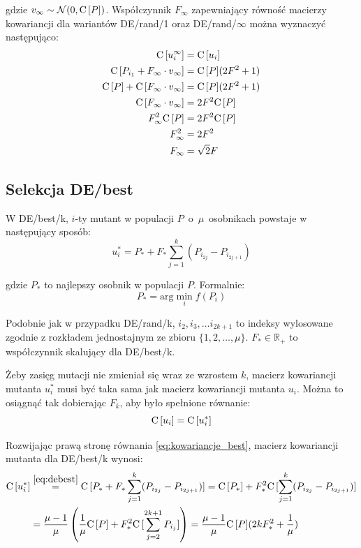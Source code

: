 \documentclass[a4paper,onecolumn,oneside,12pt,wide,floatssmall]{mwrep}
\def\C{{\rm C}\,}
\theoremstyle{definition}
\theoremstyle{plain}%
\theoremstyle{remark}
\begin{document}
gdzie $v_\infty \sim \mathcal{N}(0, \C[P])$. Współczynnik $F_\infty$ zapewniający
równość macierzy kowariancji dla wariantów DE/rand/1 oraz DE/rand/$\infty$
można wyznaczyć następująco:
\begin{align*}
\C[u_i^\infty] &= \C[u_i] \\
\C[P_{i_1} + F_\infty \cdot v_\infty] &= \C[P](2F^2 + 1) \\
\C[P] + \C[F_\infty \cdot v_\infty] &= \C[P](2F^2 + 1) \\
\C[F_\infty \cdot v_\infty] &= 2F^2\C[P] \\
F_\infty^2 \C[P] &= 2F^2\C[P] \\
F_\infty^2 &= 2F^2 \\
F_\infty &= \sqrt{2}F
\end{align*}

\subsection{Selekcja DE/best}

W DE/best/k, $i$-ty mutant w populacji $P$~o~$\mu$~osobnikach powstaje w następujący sposób:
\begin{equation} \label{eq:debest}
u_i^* = P_* + F_*\sum\limits_{j=1}^k (P_{i_{2j}} - P_{i_{2j+1}})
\end{equation}

gdzie $P_*$ to najlepszy osobnik w populacji $P$. Formalnie:
\begin{equation} \label{eq:best_point}
P_* = \text{arg} \min_i f(P_i)
\end{equation}

Podobnie jak w przypadku DE/rand/k, $i_2, i_3, \dots i_{2k+1}$ to indeksy wylosowane zgodnie z rozkładem jednostajnym ze zbioru 
$\{1, 2, \dots, \mu\}$. $F_*\in\mathbb{R_+}$ to współczynnik skalujący dla DE/best/k. 

Żeby zasięg mutacji nie zmieniał się wraz ze wzrostem $k$, 
macierz kowariancji mutanta $u_i^*$ musi być taka sama jak macierz kowariancji mutanta $u_i$.
Można to osiągnąć tak dobierając $F_k$, aby było spełnione równanie:
\begin{equation} \label{eq:kowariancje_best}
\C[u_i] = \C[u_i^*]
\end{equation}

Rozwijając prawą stronę równania \eqref{eq:kowariancje_best}, macierz kowariancji mutanta dla DE/best/k wynosi:
\begin{equation}
\begin{align}
 \label{eq:macierz_kow_mutanta_star}
\C[u_i^*] &\overset{\eqref{eq:debest}}{=} \C[P_* + F_*\sum\limits_{j=1}^k (P_{i_{2j}} - P_{i_{2j+1}})] 
= \C[P_*] + F_*^2\C[\sum\limits_{j=1}^k (P_{i_{2j}} - P_{i_{2j+1}})] \\
&= \frac{\mu - 1}{\mu}\left(\frac{1}{\mu}\C[P] + F_*^2\C[\sum\limits_{j=2}^{2k+1} P_{i_{j}}]\right) 
= \frac{\mu - 1}{\mu}\C[P](2kF_*^2 + \frac{1}{\mu})
\end{align}
\end{equation}
\end{document}
